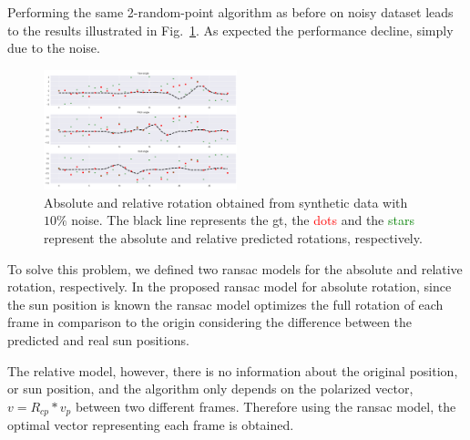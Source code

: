 Performing the same 2-random-point algorithm as before on noisy dataset leads
to the results illustrated in Fig.~\ref{fig:res-noisy-syn-abs-rel}. As expected the
performance decline, simply due to the noise.
\begin{figure}
  \includegraphics[width=0.5\textwidth]{./content/experiments/figures/noisy-syn-abs-rel-2.png}
  \caption{Absolute and relative rotation obtained from synthetic data with
    $10\%$ noise. The black line represents the \gls{gt}, the
    \textcolor{red}{dots} and the \textcolor{green}{stars} represent the
    absolute and relative predicted rotations, respectively.}
  \label{fig:res-noisy-syn-abs-rel}
\end{figure}

To solve this problem, we defined two ransac models for the absolute and
relative rotation, respectively.  In the proposed ransac model for absolute
rotation, since the sun position is known the ransac model optimizes the full
rotation of each frame in comparison to the origin considering the difference
between the predicted and real sun positions.

The relative model, however, there is no information about the original
position, or sun position, and the algorithm only depends on the polarized
vector, $v = R_{cp}*v_p$ between two different frames. Therefore using the ransac
model, the optimal vector representing each frame is obtained.

